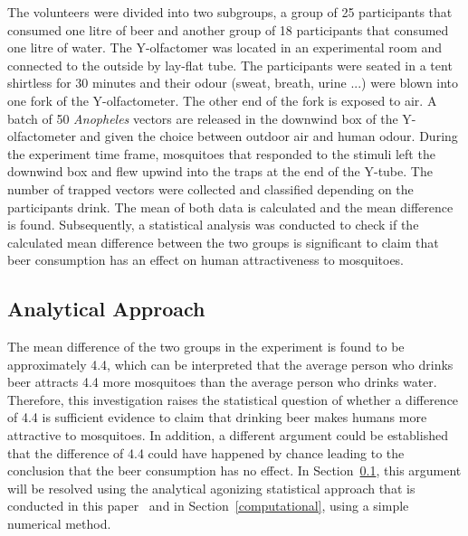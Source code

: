 The volunteers were divided into two subgroups, a group of 25 participants that consumed one litre of beer and another group of 18 participants that consumed one litre of water. The Y-olfactomer was located in an experimental room and connected to the outside by lay-flat tube.  The participants were seated in a tent shirtless for 30 minutes and their odour (sweat, breath, urine ...) were  blown into one fork of the Y-olfactometer. The other end of the fork is exposed to air. A batch of 50 \textit{Anopheles} vectors are released in the downwind box of the Y-olfactometer and given the choice between outdoor air and human odour. During the experiment time frame, mosquitoes that responded to the stimuli left the downwind box and flew upwind into the traps at the end of the Y-tube. The number of trapped vectors were collected and classified depending on the participants drink. The mean of both data is calculated and the mean difference is found. Subsequently, a statistical analysis was conducted to check if the calculated mean difference between the two groups is significant to claim that beer consumption has an effect on human attractiveness to mosquitoes.


\subsection{Analytical Approach}\label{stats}
The mean difference of the two groups in the experiment is found to be approximately 4.4, which can be interpreted that the average person who drinks beer attracts 4.4 more mosquitoes than the average person who drinks water. Therefore, this investigation raises the statistical question of whether a difference of 4.4 is sufficient evidence to claim that drinking beer makes humans more attractive to mosquitoes. In addition, a different argument could be  established that the difference of 4.4 could have happened by chance leading to the conclusion that the beer consumption has no effect. In Section~\ref{stats}, this argument will be resolved using the analytical agonizing statistical approach that is conducted in this paper~\cite{lefevre2010beer} and in Section~\ref{computational}, using a simple numerical method.

